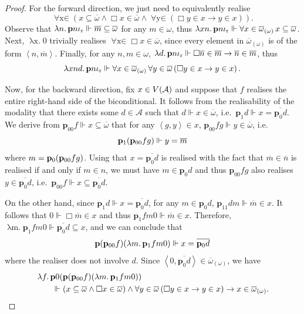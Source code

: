\documentclass[12pt,openany]{book}
\theoremstyle{plain}
\theoremstyle{definition}
\newcommand\tuple[1]{\left\langle #1 \right\rangle}
\newcommand\opA[1]{\mathop{\forall #1}}
\newcommand\oplam[1]{\mathop{\lambda #1.}}
\newcommand\bp{\mathbf{p}}
\newcommand\ior{\iota_\textup{r}}
\begin{document}
\begin{proof}
  For the forward direction, we just need to equivalently realise
  \[\opA{x \in \overline{\omega}_{(\omega)}} \left(x \subseteq \overline{\omega} \land \Box x \in \overline{\omega} \land \opA{y \in \overline{\omega}} \left(\Box y \in x \rightarrow y \in x\right)\right).\]
  Observe that $\oplam{n} \bp n \ior \Vdash \overline{m} \subseteq \overline{\omega}$ for any $m \in \omega$, thus $\oplam{xn} \bp n \ior \Vdash \opA{x \in \overline{\omega}_{(\omega)}} x \subseteq \overline{\omega}$. Next, $\oplam{x} 0$ trivially realises $\opA{x \in \overline{\omega}_{(\omega)}} \Box x \in \overline{\omega}$, since every element in $\overline{\omega}_{(\omega)}$ is of the form $\tuple{n, \overline{m}}$. Finally, for any $n, m \in \omega$, $\oplam{d} \bp n \ior \Vdash \Box \overline{n} \in \overline{m} \rightarrow \overline{n} \in \overline{m}$, thus
  \[\oplam{xnd} \bp n \ior \Vdash \opA{x \in \overline{\omega}_{(\omega)}} \opA{y \in \overline{\omega}} \left(\Box y \in x \rightarrow y \in x\right).\]

  Now, for the backward direction, fix $x \in V\mleft(\mathcal{A}\mright)$ and suppose that $f$ realises the entire right-hand side of the biconditional. It follows from the realisability of the modality that there exists some $d \in \mathcal{A}$ such that $d \Vdash x \in \overline{\omega}$, i.e.\ $\bp_1 d \Vdash x = \overline{\bp_0 d}$. We derive from $\bp_{00} f \Vdash x \subseteq \overline{\omega}$ that for any $\tuple{g, y} \in x$, $\bp_{00} fg \Vdash y \in \overline{\omega}$, i.e.
  \[\bp_1 \mleft(\bp_{00} fg\mright) \Vdash y = \overline{m}\]
  where $m = \bp_0 \mleft(\bp_{00} fg\mright)$. Using that $x = \overline{\bp_0 d}$ is realised with the fact that $\overline{m} \in \overline{n}$ is realised if and only if $m \in n$, we must have $m \in \bp_0 d$ and thus $\bp_{00} fg$ also realises $y \in \overline{\bp_0 d}$, i.e.\ $\bp_{00} f \Vdash x \subseteq \overline{\bp_0 d}$.

  On the other hand, since $\bp_1 d \Vdash x = \overline{\bp_0 d}$, for any $m \in \bp_0 d$, $\bp_{11} dm \Vdash \overline{m} \in x$. It follows that $0 \Vdash \Box \overline{m} \in x$ and thus $\bp_1 fm0 \Vdash \overline{m} \in x$. Therefore, $\oplam{m} \bp_1 fm0 \Vdash \overline{\bp_0 d} \subseteq x$, and we can conclude that
  \[\bp \mleft(\bp_{00} f\mright) \mleft(\oplam{m} \bp_1 fm0\mright) \Vdash x = \overline{\bp_0 d}\]
  where the realiser does not involve $d$. Since $\tuple{0, \overline{\bp_0 d}} \in \overline{\omega}_{(\omega)}$, we have
  \begin{align*}
     & \oplam{f} \bp 0 \mleft(\bp \mleft(\bp_{00} f\mright) \mleft(\oplam{m} \bp_1 fm0\mright)\mright)                                                                                                                                           \\
     & \qquad {} \Vdash \left(x \subseteq \overline{\omega} \land \Box x \in \overline{\omega}\right) \land \opA{y \in \overline{\omega}} \left(\Box y \in x \rightarrow y \in x\right) \rightarrow x \in \overline{\omega}_{(\omega)}. \qedhere
  \end{align*}
\end{proof}
\end{document}
